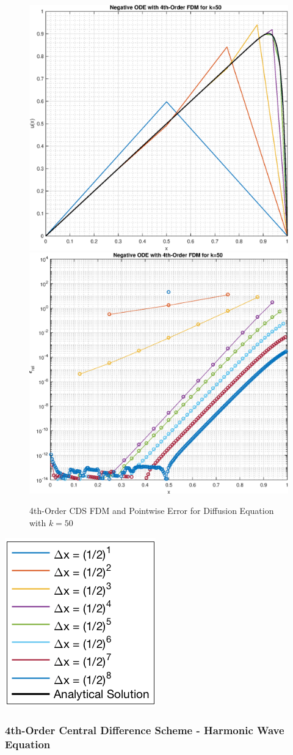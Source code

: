 \documentclass[10pt]{article}		%
\numberwithin{equation}{section}
\begin{document}
\begin{figure}[H]
	\begin{center}
		\includegraphics[width = 0.31\linewidth]{negative_ode_order_4_k_50}
		\includegraphics[width = 0.31\linewidth]{error_negative_ode_order_4_k_50}
		\caption{4th-Order CDS FDM and Pointwise Error for Diffusion Equation with $k = 50$}
	\end{center}
\end{figure}

\begin{center}
	\includegraphics[height = 0.19\linewidth]{legend}
\end{center}

\newpage

\subsubsection{4th-Order Central Difference Scheme - Harmonic Wave Equation}
\end{document}
